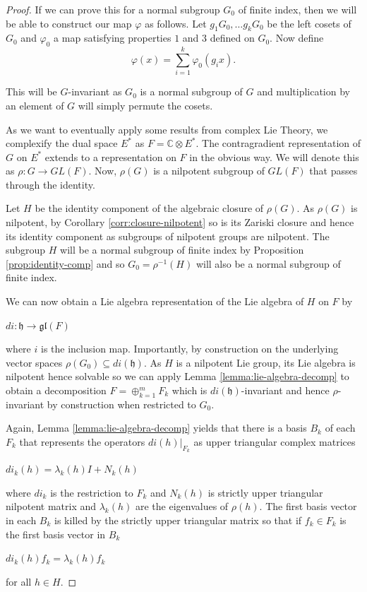 \begin{proof}
    If we can prove this for a normal subgroup $G_0$ of finite index, then we will be able to construct our map $\varphi$ as follows.
    Let $g_1G_0, \dots g_kG_0$ be the left cosets of $G_0$ and $\varphi_0$ a map satisfying properties $1$ and $3$ defined on $G_0$.
    Now define
    $$\varphi(x) = \sum^{k}_{i=1} \varphi_0(g_ix).$$

    This will be $G$-invariant as $G_0$ is a normal subgroup of $G$ and
    multiplication by an element of $G$ will simply permute the cosets.

    As we want to eventually apply some results from complex Lie Theory, we
    complexify the dual space $E^*$ as $F = \mathbb{C}\otimes E^*$. The
    contragradient representation of $G$ on $E^*$ extends to a representation on
    $F$ in the obvious way. We will denote this as $\rho : G \to GL(F)$. Now,
    $\rho(G)$ is a nilpotent subgroup of $GL(F)$ that passes through the identity.

    Let $H$ be the identity component of the algebraic closure of $\rho(G)$. As
    $\rho(G)$ is nilpotent, by Corollary \ref{corr:closure-nilpotent} so is its
    Zariski closure and hence its identity component as subgroups of nilpotent
    groups are nilpotent. The subgroup $H$ will be a normal subgroup of finite
    index by Proposition \ref{prop:identity-comp} and so $G_0 = \rho^{-1}(H)$ will
    also be a normal subgroup of finite index.

    We can now obtain a Lie algebra representation of the Lie algebra of $H$ on $F$
    by
    \begin{center}
        $di: \mathfrak{h} \to \mathfrak{gl}(F)$
    \end{center}
    where $i$ is the inclusion map. Importantly, by construction on the underlying vector spaces $\rho(G_0) \subseteq di(\mathfrak{h})$. As $H$ is a nilpotent Lie group, its Lie algebra is nilpotent hence solvable so we can
    apply Lemma \ref{lemma:lie-algebra-decomp} to obtain a decomposition $F = \oplus^m_{k=1} F_k$ which is $di(\mathfrak{h})$-invariant and hence $\rho$-invariant by
    construction when restricted to $G_0$.

    Again, Lemma \ref{lemma:lie-algebra-decomp} yields that there is a basis $B_k$
    of each $F_k$ that represents the operators $di(h)|_{F_k}$ as upper triangular
    complex matrices
    \begin{center}
        $di_k(h) = \lambda_k(h)I + N_k(h)$
    \end{center}
    where $di_k$ is the restriction to $F_k$ and $N_k(h)$ is strictly upper triangular nilpotent matrix and $\lambda_k(h)$ are the eigenvalues of $\rho(h)$.
    The first basis vector in each $B_k$ is killed by the strictly upper triangular matrix so that if $f_k\in F_k$ is the
    first basis vector in $B_k$
    \begin{center}
        $di_k(h)f_k = \lambda_k(h)f_k$
    \end{center}
    for all $h \in H$.


\end{proof}
